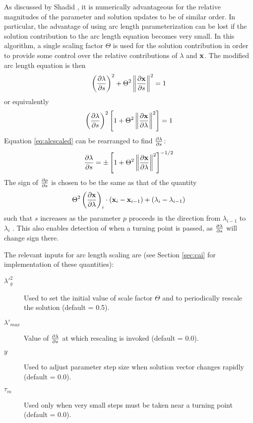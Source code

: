 As discussed by Shadid \cite{jnsthesis}, it is numerically advantageous for the relative magnitudes of the parameter and solution updates to be of similar order. In particular, the advantage of using arc length parameterization can be lost if the solution contribution to the arc length equation becomes very small. In this algorithm, a single scaling factor $\Theta$ is used for the solution contribution in order to provide some control over the relative contributions of $\lambda$ and ${\bf x}$. The modified arc length equation is then
\begin{equation}
\label{eq:alescaled}
\left( \frac{\partial \lambda}{\partial s} \right)^2 + \Theta^2 \left\| \frac{\partial {\bf x}}{\partial s} \right\|^2 = 1
\end{equation}
or equivalently
\begin{equation}
\label{eq:alcscaled}
\left( \frac{\partial \lambda}{\partial s} \right)^2 \left[ 1 + \Theta^2 \left\| \frac{\partial {\bf x}}{\partial \lambda} \right\|^2 \right] = 1
\end{equation}
Equation \ref{eq:alcscaled} can be rearranged to find $\frac{\partial \lambda}{\partial s}$:
\begin{equation}
\label{eq:dpds}
\frac{\partial \lambda}{\partial s} = \pm \left[ 1 + \Theta^2 \left\| \frac{\partial {\bf x}}{\partial \lambda} \right\|^2 \right]^{-1/2}
\end{equation}
The sign of $\frac{\partial p}{\partial s}$ is chosen to be the same as that of the quantity
\begin{equation}
\label{eq:dpdssign}
\Theta^2 \left( \frac{\partial {\bf x}}{\partial \lambda} \right)_i \cdot \left( {\bf x}_i - {\bf x}_{i-1} \right) + \left( \lambda_i - \lambda_{i-1} \right)
\end{equation}
such that $s$ increases as the parameter $p$ proceeds in the direction from $\lambda_{i-1}$ to $\lambda_i$ \cite{jnsthesis}. This also enables detection of when a turning point is passed, as $\frac{\partial \lambda}{\partial s}$ will change sign there.

The relevant inputs for arc length scaling are (see Section \ref{sec:cai} for implementation of these quantities):

\begin{description}
\item[$\lambda'^2_g$] Used to set the initial value of scale factor $\Theta$ and to periodically rescale the solution (default = 0.5).

\item[$\lambda'_{max}$] Value of $\frac{\partial \lambda}{\partial s}$ at which rescaling is invoked (default = 0.0).

\item[$y$] Used to adjust parameter step size when solution vector changes rapidly (default = 0.0).

\item[$\tau_m$] Used only when very small steps must be taken near a turning point (default = 0.0).
\end{description}

